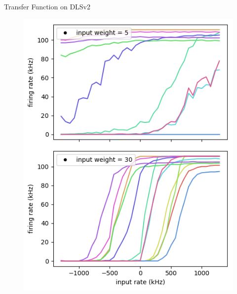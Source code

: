 \documentclass[12pt, aspectratio=169]{beamer}
\begin{document}
\begin{frame}{Transfer Function on DLSv2}
    \centering
            \begin{figure}
                \includegraphics[scale=0.48]{uncalibrated_activation_function_input.png}
                \label{membrane_potential}
            \end{figure}
\end{frame}
\end{document}
